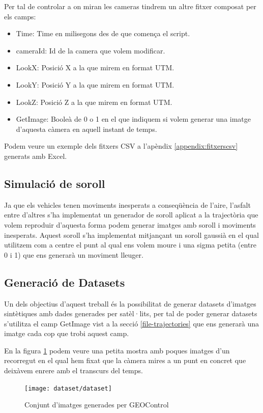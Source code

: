 \documentclass[10pt,a4paper,twocolumn,twoside]{article}
\begin{document}
Per tal de controlar a on miran les cameras tindrem un altre fitxer composat per els camps:

\begin{itemize}
\item Time: Time en milisegons des de que comença el script.
\item cameraId: Id de la camera que volem modificar.
\item LookX: Posició X a la que mirem en format UTM.
\item LookY: Posició Y a la que mirem en format UTM.
\item LookZ: Posició Z a la que mirem en format UTM.
\item GetImage: Booleà de 0 o 1 en el que indiquem si volem generar una imatge d'aquesta càmera en aquell instant de temps.
\end{itemize}

Podem veure un exemple dels fitxers CSV a l'apèndix \ref{appendix:fitxerscsv} generats amb Excel.

\subsection{Simulació de soroll}
Ja que els vehicles tenen moviments inesperats a conseqüència de l'aire, l'asfalt entre d'altres s'ha implementat un generador de soroll aplicat a la trajectòria que volem reproduir d'aquesta forma podem generar imatges amb soroll i moviments inesperats. Aquest soroll s'ha implementat mitjançant un soroll gaussià en el qual utilitzem com a centre el punt al qual ens volem moure i una sigma petita (entre 0 i 1) que ens generarà un moviment lleuger.

\subsection{Generació de Datasets}
Un dels objectius d'aquest treball és la possibilitat de generar datasets d'imatges sintètiques amb dades generades per satèl·lits, per tal de poder generar datasets s'utilitza el camp GetImage vist a la secció \ref{file-trajectories} que ens generarà una imatge cada cop que trobi aquest camp.

En la figura \ref{fig-dataset} podem veure una petita mostra amb poques imatges d'un recorregut en el qual hem fixat que la càmera mires a un punt en concret que deixàvem enrere amb el transcurs del temps. 

\begin{figure}[!h]
\centering
  	\texttt{[image: dataset/dataset]}
	\caption{Conjunt d'imatges generades per GEOControl}
	\label{fig-dataset}
\end{figure}
\end{document}
